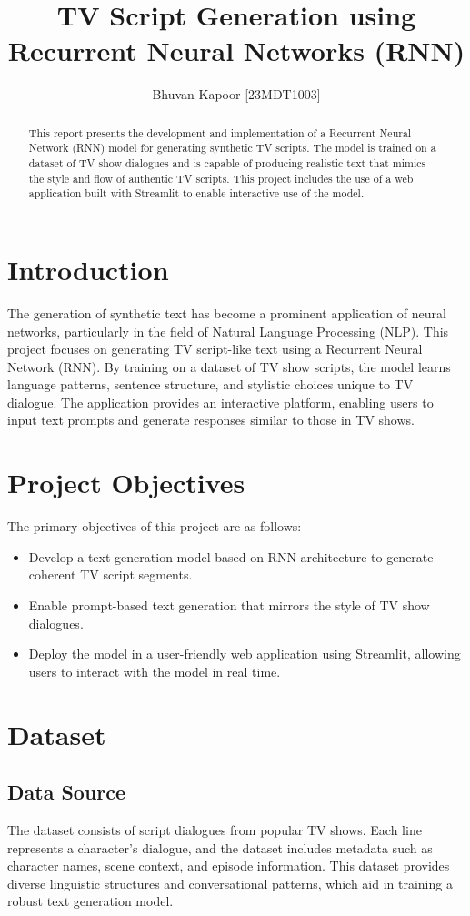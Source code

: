 \documentclass{article}
\title{TV Script Generation using Recurrent Neural Networks (RNN)}
\author{Bhuvan Kapoor [23MDT1003]}
\date{}
\begin{document}
\maketitle

\begin{abstract}
This report presents the development and implementation of a Recurrent Neural Network (RNN) model for generating synthetic TV scripts. The model is trained on a dataset of TV show dialogues and is capable of producing realistic text that mimics the style and flow of authentic TV scripts. This project includes the use of a web application built with Streamlit to enable interactive use of the model. 
\end{abstract}

\section{Introduction}
The generation of synthetic text has become a prominent application of neural networks, particularly in the field of Natural Language Processing (NLP). This project focuses on generating TV script-like text using a Recurrent Neural Network (RNN). By training on a dataset of TV show scripts, the model learns language patterns, sentence structure, and stylistic choices unique to TV dialogue. The application provides an interactive platform, enabling users to input text prompts and generate responses similar to those in TV shows.

\section{Project Objectives}
The primary objectives of this project are as follows:
\begin{itemize}
    \item Develop a text generation model based on RNN architecture to generate coherent TV script segments.
    \item Enable prompt-based text generation that mirrors the style of TV show dialogues.
    \item Deploy the model in a user-friendly web application using Streamlit, allowing users to interact with the model in real time.
\end{itemize}

\section{Dataset}
\subsection{Data Source}
The dataset consists of script dialogues from popular TV shows. Each line represents a character’s dialogue, and the dataset includes metadata such as character names, scene context, and episode information. This dataset provides diverse linguistic structures and conversational patterns, which aid in training a robust text generation model.
\end{document}
